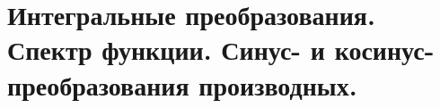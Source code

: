 \section{Интегральные преобразования. Спектр функции. Синус- и
косинус-преобразования производных.}

\newpage
